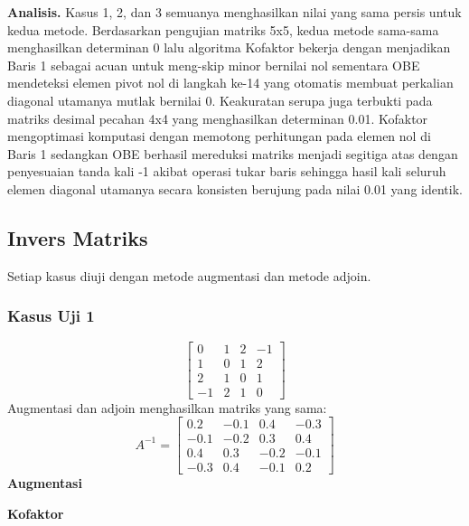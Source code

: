 \textbf{Analisis.} Kasus 1, 2, dan 3 semuanya menghasilkan nilai yang sama persis untuk kedua metode. Berdasarkan pengujian matriks 5x5, kedua metode sama-sama menghasilkan determinan 0 lalu algoritma Kofaktor bekerja  dengan menjadikan Baris 1 sebagai acuan untuk meng-skip minor bernilai nol sementara OBE mendeteksi elemen pivot nol di langkah ke-14 yang otomatis membuat perkalian diagonal utamanya mutlak bernilai 0.
 Keakuratan serupa juga terbukti pada matriks desimal pecahan 4x4 yang menghasilkan determinan 0.01. Kofaktor  mengoptimasi komputasi dengan memotong perhitungan pada elemen nol di Baris 1 sedangkan OBE berhasil mereduksi matriks menjadi segitiga atas dengan penyesuaian tanda kali -1 akibat operasi tukar baris sehingga hasil kali seluruh elemen diagonal utamanya secara konsisten berujung pada nilai 0.01 yang identik.

\subsection{Invers Matriks}

Setiap kasus diuji dengan metode augmentasi dan metode adjoin.

\subsubsection{Kasus Uji 1}
\begin{kasus}
\[
\begin{bmatrix}
0 & 1 & 2 & -1 \\
1 & 0 & 1 & 2 \\
2 & 1 & 0 & 1 \\
-1 & 2 & 1 & 0
\end{bmatrix}
\]
Augmentasi dan adjoin menghasilkan matriks yang sama:
\[
A^{-1} = \begin{bmatrix}
0.2 & -0.1 & 0.4 & -0.3 \\
-0.1 & -0.2 & 0.3 & 0.4 \\
0.4 & 0.3 & -0.2 & -0.1 \\
-0.3 & 0.4 & -0.1 & 0.2
\end{bmatrix}
\]
\textbf{Augmentasi}

\textbf{Kofaktor}
\end{kasus}

